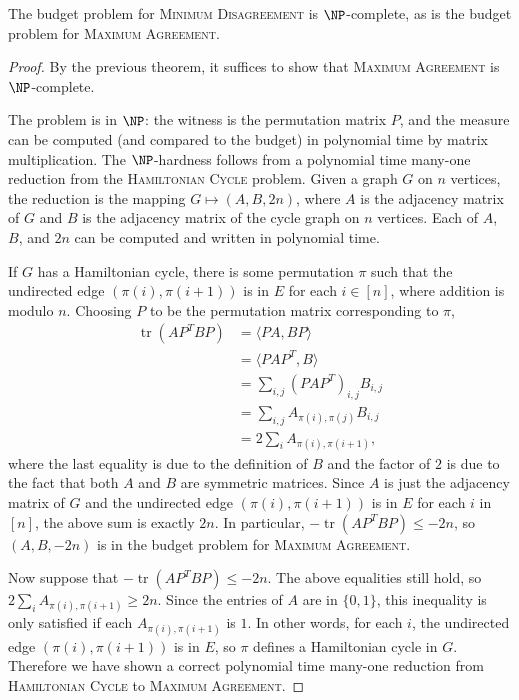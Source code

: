 \documentclass{article}
\newcommand{\1}{\mathbf{1}}
\newcommand{\MD}{\textsc{Minimum Disagreement}}
\renewcommand{\MA}{\textsc{Maximum Agreement}}
\DeclareMathOperator{\tr}{tr}
\begin{document}
\begin{theorem}
  The budget problem for \MD{} is $\NP$-complete, as is the budget problem for \MA{}.
\end{theorem}
\begin{proof}
  By the previous theorem, it suffices to show that \MA{} is $\NP$-complete.

  The problem is in $\NP$: the witness is the permutation matrix $P$, and the measure can be computed (and compared to the budget) in polynomial time by matrix multiplication.
  The $\NP$-hardness follows from a polynomial time many-one reduction from the \textsc{Hamiltonian Cycle} problem.
  Given a graph $G$ on $n$ vertices, the reduction is the mapping $G \mapsto (A, B, 2n)$, where $A$ is the adjacency matrix of $G$ and $B$ is the adjacency matrix of the cycle graph on $n$ vertices.
  Each of $A$, $B$, and $2n$ can be computed and written in polynomial time.

  If $G$ has a Hamiltonian cycle, there is some permutation $\pi$ such that the undirected edge $(\pi(i), \pi(i + 1))$ is in $E$ for each $i \in [n]$, where addition is modulo $n$.
  Choosing $P$ to be the permutation matrix corresponding to $\pi$,
  \begin{align*}
    \tr(AP^TBP) & = \langle PA, BP \rangle  \\
    & = \langle PAP^T, B \rangle \\
    & = \sum_{i, j} (PAP^T)_{i, j} B_{i, j} \\
    & = \sum_{i, j} A_{\pi(i), \pi(j)} B_{i, j} \\
    & = 2 \sum_i A_{\pi(i), \pi(i + 1)},
  \end{align*}
  where the last equality is due to the definition of $B$ and the factor of $2$ is due to the fact that both $A$ and $B$ are symmetric matrices.
  Since $A$ is just the adjacency matrix of $G$ and the undirected edge $(\pi(i), \pi(i + 1))$ is in $E$ for each $i$ in $[n]$, the above sum is exactly $2n$.
  In particular, $-\tr(AP^TBP) \leq -2n$, so $(A, B, -2n)$ is in the budget problem for \MA{}.

  Now suppose that $-\tr(AP^TBP) \leq -2n$.
  The above equalities still hold, so $2\sum_i A_{\pi(i), \pi(i + 1)} \geq 2n$.
  Since the entries of $A$ are in $\{0, 1\}$, this inequality is only satisfied if each $A_{\pi(i), \pi(i + 1)}$ is $1$.
  In other words, for each $i$, the undirected edge $(\pi(i), \pi(i + 1))$ is in $E$, so $\pi$ defines a Hamiltonian cycle in $G$.
  Therefore we have shown a correct polynomial time many-one reduction from \textsc{Hamiltonian Cycle} to \MA{}.
\end{proof}
\end{document}
